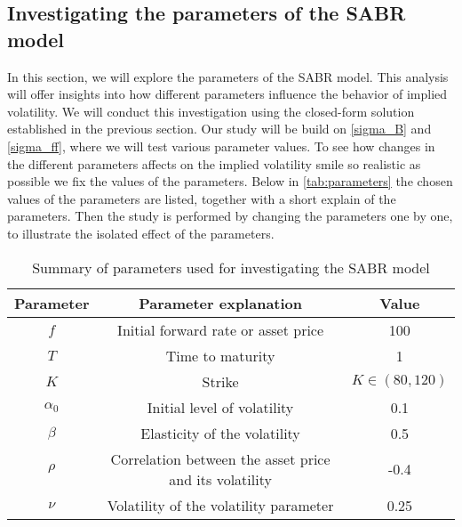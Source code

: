 \subsection{Investigating the parameters of the SABR model} \label{invest_sabr}
In this section, we will explore the parameters of the SABR model. This analysis will offer insights into 
how different parameters influence the behavior of implied volatility. We will conduct this investigation using 
the closed-form solution established in the previous section. Our study will be build on  \autoref{sigma_B} and 
\autoref{sigma_ff}, where we will test various parameter values. To see how changes in the different parameters
affects on the implied volatility smile so realistic as possible we fix the values of the parameters.
Below in \autoref{tab:parameters} the chosen values of the parameters are listed, together with a short
explain of the parameters. Then the study is performed by changing the parameters one by one, to illustrate the 
isolated effect of the parameters. 
\\
\begin{table}[H]
    \centering
    \begin{tabular}{ccc}
      \toprule
      \textbf{Parameter} & \textbf{Parameter explanation} & \textbf{Value} \\
      \midrule
      \rowcolor{lightgray!40} $f$ & Initial forward rate or asset price & 100 \\
      $T$ & Time to maturity & 1 \\
      \rowcolor{lightgray!40} $K$ & Strike & $K \in (80,120)$ \\
      $\alpha_0$ & Initial level of volatility & 0.1 \\
      \rowcolor{lightgray!40} $\beta$ & Elasticity of the volatility & 0.5 \\
      $\rho$ & Correlation between the asset price and its volatility & -0.4 \\
      \rowcolor{lightgray!40} $\nu$ & Volatility of the volatility parameter & 0.25 \\
      \bottomrule
    \end{tabular}
    \caption{Summary of parameters used for investigating the SABR model}
    \label{tab:parameters}
\end{table}
\noindent


